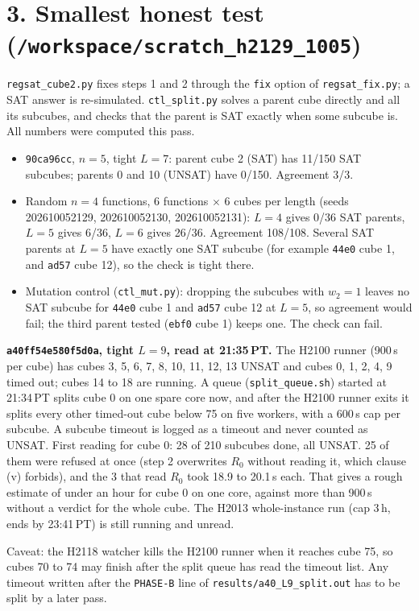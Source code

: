 \documentclass[11pt]{article}
\begin{document}
\section*{3. Smallest honest test (\texttt{/workspace/scratch\_h2129\_1005})}
\texttt{regsat\_cube2.py} fixes steps 1 and 2 through the \texttt{fix} option of \texttt{regsat\_fix.py}; a SAT answer is re-simulated. \texttt{ctl\_split.py} solves a parent cube directly and all its subcubes, and checks that the parent is SAT exactly when some subcube is. All numbers were computed this pass.
\begin{itemize}
\item \texttt{90ca96cc}, $n=5$, tight $L=7$: parent cube 2 (SAT) has 11/150 SAT subcubes; parents 0 and 10 (UNSAT) have 0/150. Agreement 3/3.
\item Random $n=4$ functions, 6 functions $\times$ 6 cubes per length (seeds 202610052129, 202610052130, 202610052131): $L=4$ gives 0/36 SAT parents, $L=5$ gives 6/36, $L=6$ gives 26/36. Agreement 108/108. Several SAT parents at $L=5$ have exactly one SAT subcube (for example \texttt{44e0} cube 1, and \texttt{ad57} cube 12), so the check is tight there.
\item Mutation control (\texttt{ctl\_mut.py}): dropping the subcubes with $w_2=1$ leaves no SAT subcube for \texttt{44e0} cube 1 and \texttt{ad57} cube 12 at $L=5$, so agreement would fail; the third parent tested (\texttt{ebf0} cube 1) keeps one. The check can fail.
\end{itemize}

\textbf{\texttt{a40ff54e580f5d0a}, tight $L=9$, read at 21:35\,PT.} The H2100 runner (900\,s per cube) has cubes 3, 5, 6, 7, 8, 10, 11, 12, 13 UNSAT and cubes 0, 1, 2, 4, 9 timed out; cubes 14 to 18 are running. A queue (\texttt{split\_queue.sh}) started at 21:34\,PT splits cube 0 on one spare core now, and after the H2100 runner exits it splits every other timed-out cube below 75 on five workers, with a 600\,s cap per subcube. A subcube timeout is logged as a timeout and never counted as UNSAT. First reading for cube 0: 28 of 210 subcubes done, all UNSAT. 25 of them were refused at once (step 2 overwrites $R_0$ without reading it, which clause (v) forbids), and the 3 that read $R_0$ took 18.9 to 20.1\,s each. That gives a rough estimate of under an hour for cube 0 on one core, against more than 900\,s without a verdict for the whole cube. The H2013 whole-instance run (cap 3\,h, ends by 23:41\,PT) is still running and unread.

Caveat: the H2118 watcher kills the H2100 runner when it reaches cube 75, so cubes 70 to 74 may finish after the split queue has read the timeout list. Any timeout written after the \texttt{PHASE-B} line of \texttt{results/a40\_L9\_split.out} has to be split by a later pass.
\end{document}
